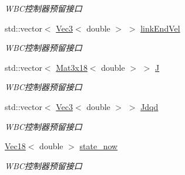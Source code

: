 \begin{DoxyCompactItemize}
\begin{DoxyCompactList}\small\item\em W\+B\+C控制器预留接口 \end{DoxyCompactList}\item 
\mbox{\label{classquadruped_1_1RobotModel_a8afcf6c2221f9e10764d95635579ef9a}} 
std\+::vector$<$ \hyperlink{cppTypes_8h_a65c27bf97693676535dd0b30ea0ad399}{Vec3}$<$ double $>$ $>$ \hyperlink{classquadruped_1_1RobotModel_a8afcf6c2221f9e10764d95635579ef9a}{link\+End\+Vel}
\begin{DoxyCompactList}\small\item\em W\+B\+C控制器预留接口 \end{DoxyCompactList}\item 
\mbox{\label{classquadruped_1_1RobotModel_a58d2ff5d89e9edd8a79d60376e596dc2}} 
std\+::vector$<$ \hyperlink{cppTypes_8h_a6e18c50269e5924351437a22db0e9840}{Mat3x18}$<$ double $>$ $>$ \hyperlink{classquadruped_1_1RobotModel_a58d2ff5d89e9edd8a79d60376e596dc2}{J}
\begin{DoxyCompactList}\small\item\em W\+B\+C控制器预留接口 \end{DoxyCompactList}\item 
\mbox{\label{classquadruped_1_1RobotModel_ae37b51b3c4aa8e23defbdb698059bb4c}} 
std\+::vector$<$ \hyperlink{cppTypes_8h_a65c27bf97693676535dd0b30ea0ad399}{Vec3}$<$ double $>$ $>$ \hyperlink{classquadruped_1_1RobotModel_ae37b51b3c4aa8e23defbdb698059bb4c}{Jdqd}
\begin{DoxyCompactList}\small\item\em W\+B\+C控制器预留接口 \end{DoxyCompactList}\item 
\mbox{\label{classquadruped_1_1RobotModel_a2eac94c558b10aee8ae1fa8c5d0b03cd}} 
\hyperlink{cppTypes_8h_a28d630783cecf8575d068f597c3793f3}{Vec18}$<$ double $>$ \hyperlink{classquadruped_1_1RobotModel_a2eac94c558b10aee8ae1fa8c5d0b03cd}{state\+\_\+now}
\begin{DoxyCompactList}\small\item\em W\+B\+C控制器预留接口 \end{DoxyCompactList}\end{DoxyCompactItemize}


